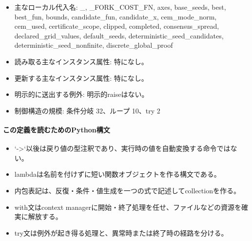 \documentclass[a4paper,11pt]{article}
\begin{document}
\begin{itemize}[leftmargin=1.6em]
              \item 主なローカル代入名: \_, \_FORK\_COST\_FN, axes, base\_seeds, best, best\_fun, bounds, candidate\_fun, candidate\_x, cem\_mode\_norm, cem\_used, certificate\_scope, clipped, completed, consensus\_spread, declared\_grid\_values, default\_seeds, deterministic\_seed\_candidates, deterministic\_seed\_nonfinite, discrete\_global\_proof
              \item 読み取る主なインスタンス属性: 特になし。
              \item 更新する主なインスタンス属性: 特になし。
              \item 明示的に送出する例外: 明示的raiseはない。
              \item 制御構造の規模: 条件分岐 32、ループ 10、try 2
            \end{itemize}
            \paragraph{この定義を読むためのPython構文}
            \begin{itemize}[leftmargin=1.6em]
            \item `->`以後は戻り値の型注釈であり、実行時の値を自動変換する命令ではない。
\item lambdaは名前を付けずに短い関数オブジェクトを作る構文である。
\item 内包表記は、反復・条件・値生成を一つの式で記述してcollectionを作る。
\item with文はcontext managerに開始・終了処理を任せ、ファイルなどの資源を確実に解放する。
\item try文は例外が起き得る処理と、異常時または終了時の経路を分ける。
            \end{itemize}
\end{document}

